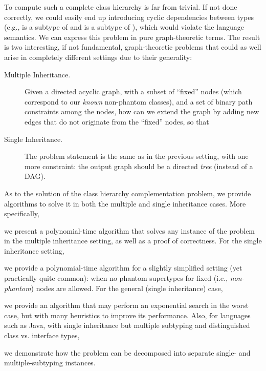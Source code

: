To compute such a complete class hierarchy is far from trivial.
If not done correctly, we could easily end up
introducing cyclic dependencies between types (e.g.,  is a
subtype of  and  is a subtype of ), which
would violate the language semantics. We can express this problem in
pure graph-theoretic terms. The result is two interesting, if not
fundamental, graph-theoretic problems that could as well arise in
completely different settings due to their generality:

\begin{description}
\item[Multiple Inheritance.] Given a directed acyclic graph, with a
  subset of ``fixed'' nodes (which correspond to our \emph{known}
  non-phantom classes), and a set of binary path constraints among the
  nodes, how can we extend the graph by adding new edges that do not
  originate from the ``fixed'' nodes, so that
\item [Single Inheritance.] The problem statement is the same as in
  the previous setting, with one more constraint: the output graph
  should be a directed \emph{tree} (instead of a DAG).
\end{description}

As to the solution of the class hierarchy complementation problem, we
provide algorithms to solve it in both the multiple and single
inheritance cases. More specifically,
\begin{inparaenum}[(1)]
\item we present a polynomial-time algorithm that solves any instance
  of the problem in the multiple inheritance setting, as well as a
  proof of correctness.
  For the single inheritance setting,
\item we provide a polynomial-time algorithm for a slightly simplified
  setting (yet practically quite common): when no phantom
  supertypes for fixed (i.e., \emph{non-phantom}) nodes are allowed.
  For the general (single inheritance) case,
\item we provide an algorithm that may perform an exponential search
  in the worst case, but with many heuristics to improve its
  performance.
  Also, for languages such as Java, with single inheritance but
  multiple subtyping and distinguished class vs.  interface types,
\item we demonstrate how the problem can be decomposed into separate
  single- and multiple-subtyping instances.
\end{inparaenum}

